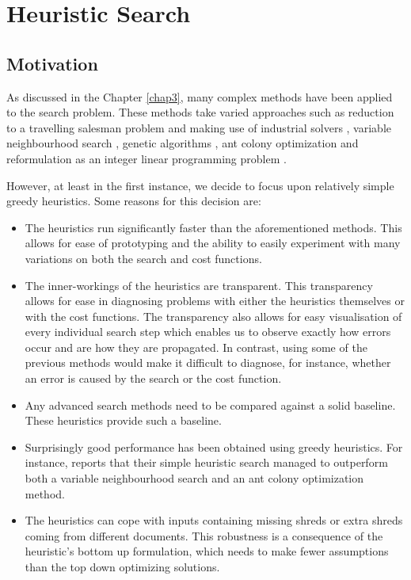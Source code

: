 \chapter{Heuristic Search}
\label{chap5}
\section{Motivation}
As discussed in the Chapter \ref{chap3}, many complex methods have been applied to the search problem. These methods take varied approaches such as reduction to a travelling salesman problem and making use of industrial solvers \cite{P1}, variable neighbourhood search \cite{P1,P5,P7}, genetic algorithms \cite{P7,P19}, ant colony optimization \cite{P5,P19} and reformulation as an integer linear programming problem \cite{P6}.

However, at least in the first instance, we decide to focus upon relatively simple greedy heuristics. Some reasons for this decision are:
\begin{itemize}
\item The heuristics run significantly faster than the aforementioned methods. This allows for ease of prototyping and the ability to easily experiment with many variations on both the search and cost functions.
\item The inner-workings of the heuristics are transparent. This transparency allows for ease in diagnosing problems with either the heuristics themselves or with the cost functions. The transparency also allows for easy visualisation of every individual search step which enables us to observe exactly how errors occur and are how they are propagated. In contrast, using some of the previous methods would make it difficult to diagnose, for instance, whether an error is caused by the search or the cost function.
\item Any advanced search methods need to be compared against a solid baseline. These heuristics provide such a baseline.
\item Surprisingly good performance has been obtained using greedy heuristics. For instance, \cite{P2} reports that their simple heuristic search managed to outperform both a variable neighbourhood search and an ant colony optimization method.
\item The heuristics can cope with inputs containing missing shreds or extra shreds coming from different documents. This robustness is a consequence of the heuristic's bottom up formulation, which needs to make fewer assumptions than the top down optimizing solutions.
\end{itemize}

